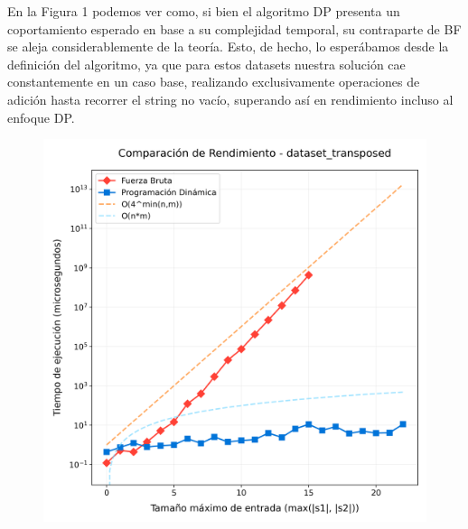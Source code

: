 En la Figura 1 podemos ver como, si bien el algoritmo DP presenta un coportamiento esperado en base a su complejidad temporal, 
su contraparte de BF se aleja considerablemente de la teoría. Esto, de hecho, lo esperábamos desde la definición del algoritmo, 
ya que para estos datasets nuestra solución cae constantemente en un caso base, realizando exclusivamente operaciones de adición hasta 
recorrer el string no vacío, superando así en rendimiento incluso al enfoque DP.  

\begin{figure}[H]
    \centering
    \begin{minipage}[t]{0.5\textwidth}
        \includegraphics[width=\textwidth]{images/comparacion_dataset_transposed.png}   
    \end{minipage}%
    \begin{minipage}[t]{0.5\textwidth}

\end{minipage}
\end{figure}
